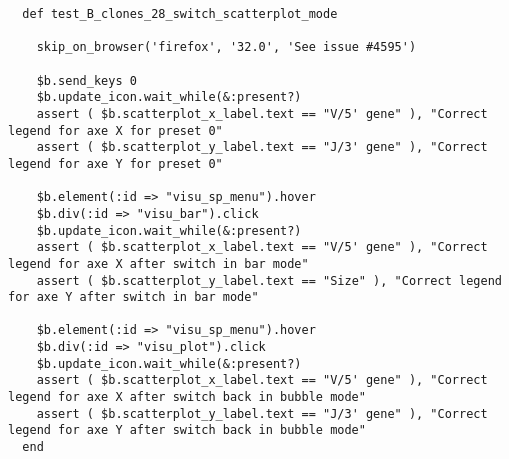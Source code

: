 
\begin{verbatim}
  def test_B_clones_28_switch_scatterplot_mode

    skip_on_browser('firefox', '32.0', 'See issue #4595')

    $b.send_keys 0
    $b.update_icon.wait_while(&:present?)
    assert ( $b.scatterplot_x_label.text == "V/5' gene" ), "Correct legend for axe X for preset 0"
    assert ( $b.scatterplot_y_label.text == "J/3' gene" ), "Correct legend for axe Y for preset 0"

    $b.element(:id => "visu_sp_menu").hover
    $b.div(:id => "visu_bar").click
    $b.update_icon.wait_while(&:present?)
    assert ( $b.scatterplot_x_label.text == "V/5' gene" ), "Correct legend for axe X after switch in bar mode"
    assert ( $b.scatterplot_y_label.text == "Size" ), "Correct legend for axe Y after switch in bar mode"

    $b.element(:id => "visu_sp_menu").hover
    $b.div(:id => "visu_plot").click
    $b.update_icon.wait_while(&:present?)
    assert ( $b.scatterplot_x_label.text == "V/5' gene" ), "Correct legend for axe X after switch back in bubble mode"
    assert ( $b.scatterplot_y_label.text == "J/3' gene" ), "Correct legend for axe Y after switch back in bubble mode"
  end
\end{verbatim}



